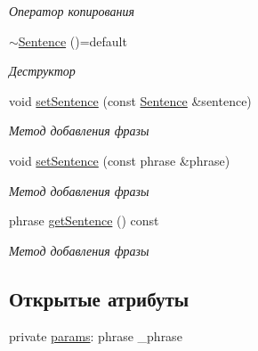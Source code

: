 \begin{DoxyCompactItemize}
\begin{DoxyCompactList}\small\item\em Оператор копирования \end{DoxyCompactList}\item 
\mbox{\label{classJarvis_1_1Sentence_ae75a8146136428d9089f3698a857276f}} 
\hyperlink{classJarvis_1_1Sentence_ae75a8146136428d9089f3698a857276f}{$\sim$\+Sentence} ()=default
\begin{DoxyCompactList}\small\item\em Деструктор \end{DoxyCompactList}\item 
void \hyperlink{classJarvis_1_1Sentence_a9663bb38ce80ea245bc8fb33e04fc41f}{set\+Sentence} (const \hyperlink{classJarvis_1_1Sentence}{Sentence} \&sentence)
\begin{DoxyCompactList}\small\item\em Метод добавления фразы \end{DoxyCompactList}\item 
void \hyperlink{classJarvis_1_1Sentence_ad026c842e31491b85f2f6f186667c799}{set\+Sentence} (const phrase \&phrase)
\begin{DoxyCompactList}\small\item\em Метод добавления фразы \end{DoxyCompactList}\item 
phrase \hyperlink{classJarvis_1_1Sentence_a480b97ff340eba0a4dcb505aefa26d40}{get\+Sentence} () const
\begin{DoxyCompactList}\small\item\em Метод добавления фразы \end{DoxyCompactList}\end{DoxyCompactItemize}
\subsection*{Открытые атрибуты}
\begin{DoxyCompactItemize}
\item 
private \hyperlink{classJarvis_1_1Sentence_a9a5cdde8bf7dc872ec20ff6afac01a0a}{params}\+: phrase \+\_\+phrase
\end{DoxyCompactItemize}
